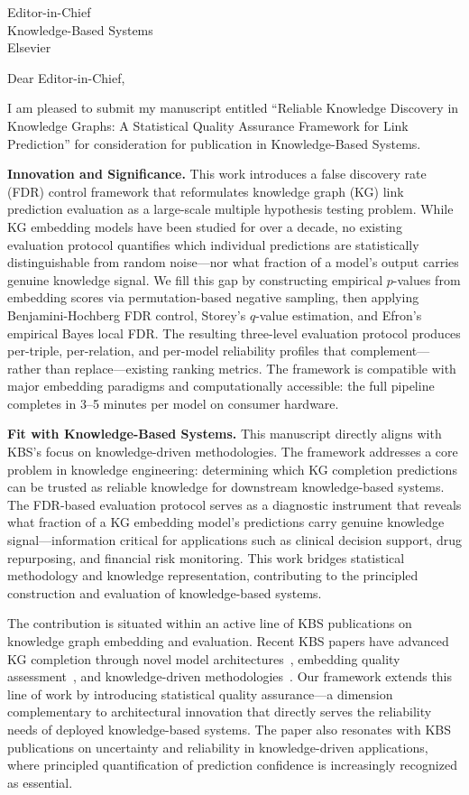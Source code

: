\documentclass{letter}
\begin{document}
\begin{letter}{Editor-in-Chief \\
Knowledge-Based Systems \\
Elsevier}

\opening{Dear Editor-in-Chief,}

I am pleased to submit my manuscript entitled ``Reliable Knowledge Discovery in Knowledge Graphs: A Statistical Quality Assurance Framework for Link Prediction'' for consideration for publication in Knowledge-Based Systems.

\textbf{Innovation and Significance.}
This work introduces a false discovery rate (FDR) control framework that reformulates knowledge graph (KG) link prediction evaluation as a large-scale multiple hypothesis testing problem. While KG embedding models have been studied for over a decade, no existing evaluation protocol quantifies which individual predictions are statistically distinguishable from random noise---nor what fraction of a model's output carries genuine knowledge signal. We fill this gap by constructing empirical $p$-values from embedding scores via permutation-based negative sampling, then applying Benjamini-Hochberg FDR control, Storey's $q$-value estimation, and Efron's empirical Bayes local FDR. The resulting three-level evaluation protocol produces per-triple, per-relation, and per-model reliability profiles that complement---rather than replace---existing ranking metrics. The framework is compatible with major embedding paradigms and computationally accessible: the full pipeline completes in 3--5 minutes per model on consumer hardware.

\textbf{Fit with Knowledge-Based Systems.}
This manuscript directly aligns with KBS's focus on knowledge-driven methodologies. The framework addresses a core problem in knowledge engineering: determining which KG completion predictions can be trusted as reliable knowledge for downstream knowledge-based systems. The FDR-based evaluation protocol serves as a diagnostic instrument that reveals what fraction of a KG embedding model's predictions carry genuine knowledge signal---information critical for applications such as clinical decision support, drug repurposing, and financial risk monitoring. This work bridges statistical methodology and knowledge representation, contributing to the principled construction and evaluation of knowledge-based systems.

The contribution is situated within an active line of KBS publications on knowledge graph embedding and evaluation. Recent KBS papers have advanced KG completion through novel model architectures~\cite{fang2025knowledge,shang2024learnable,lu2024deep}, embedding quality assessment~\cite{purohit2025vanilla}, and knowledge-driven methodologies~\cite{le2023knowledge,zhang2023conflict}. Our framework extends this line of work by introducing statistical quality assurance---a dimension complementary to architectural innovation that directly serves the reliability needs of deployed knowledge-based systems. The paper also resonates with KBS publications on uncertainty and reliability in knowledge-driven applications, where principled quantification of prediction confidence is increasingly recognized as essential.


\end{letter}
\end{document}
